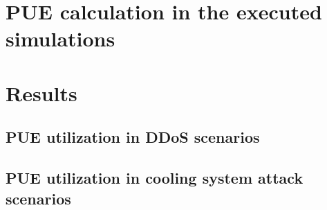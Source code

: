 \section{PUE calculation in the executed simulations}\label{section:puecalculation_tool}

\section{Results}

\subsection{PUE utilization in DDoS scenarios}

\subsection{PUE utilization in cooling system attack scenarios}

